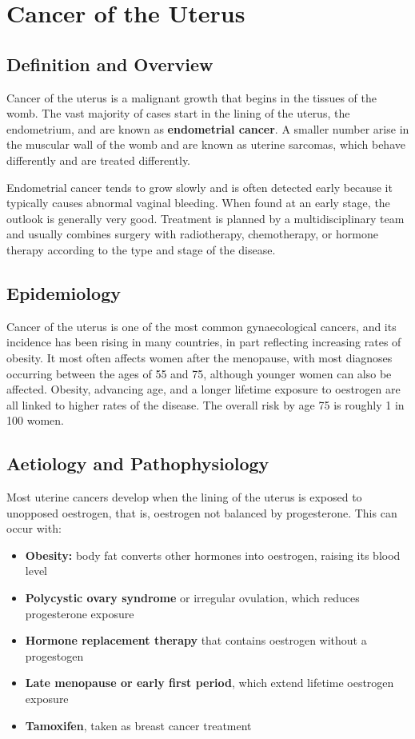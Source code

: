 \chapter{Cancer of the Uterus}

\section*{Definition and Overview}
Cancer of the uterus is a malignant growth that begins in the tissues of the womb. The vast majority of cases start in the lining of the uterus, the endometrium, and are known as \textbf{endometrial cancer}. A smaller number arise in the muscular wall of the womb and are known as uterine sarcomas, which behave differently and are treated differently.

Endometrial cancer tends to grow slowly and is often detected early because it typically causes abnormal vaginal bleeding. When found at an early stage, the outlook is generally very good. Treatment is planned by a multidisciplinary team and usually combines surgery with radiotherapy, chemotherapy, or hormone therapy according to the type and stage of the disease.

\section*{Epidemiology}
Cancer of the uterus is one of the most common gynaecological cancers, and its incidence has been rising in many countries, in part reflecting increasing rates of obesity. It most often affects women after the menopause, with most diagnoses occurring between the ages of 55 and 75, although younger women can also be affected. Obesity, advancing age, and a longer lifetime exposure to oestrogen are all linked to higher rates of the disease. The overall risk by age 75 is roughly 1 in 100 women.

\section*{Aetiology and Pathophysiology}
Most uterine cancers develop when the lining of the uterus is exposed to unopposed oestrogen, that is, oestrogen not balanced by progesterone. This can occur with:
\begin{itemize}
    \item \textbf{Obesity:} body fat converts other hormones into oestrogen, raising its blood level
    \item \textbf{Polycystic ovary syndrome} or irregular ovulation, which reduces progesterone exposure
    \item \textbf{Hormone replacement therapy} that contains oestrogen without a progestogen
    \item \textbf{Late menopause or early first period}, which extend lifetime oestrogen exposure
    \item \textbf{Tamoxifen}, taken as breast cancer treatment
\end{itemize}

